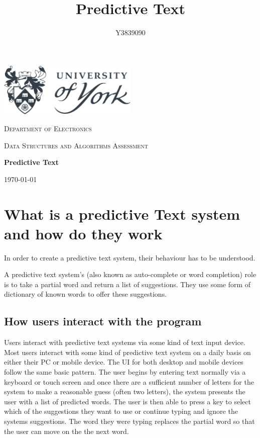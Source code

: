 \documentclass[10pt]{article} %
\title{
	Predictive Text
}
\author{Y3839090}
\begin{document}
    
	\begin{titlepage}
		\centering
		\includegraphics[width=0.5\textwidth]{UoY_logo}\par\vspace{1cm}
		{\scshape\LARGE Department of Electronics \par}
		\vspace{1cm}
		{\scshape\Large Data Structures and Algorithms Assessment \par}
		\vspace{2cm}
		{\huge\bfseries Predictive Text\par}

	
		\vfill
		{\Large\itshape \@author \par}
		\vspace{2cm}
		{\large \today\par}
	\end{titlepage}
	
	
	\tableofcontents
	\newpage
	
	
	\section{What is a predictive Text system and how do they work}
		In order to create a predictive text system, their behaviour has to be understood.
		
		A predictive text system's (also known as  auto-complete or word completion) role is to take a partial word and return a list of suggestions. They use some form of dictionary of known words to offer these suggestions.
		\subsection{How users interact with the program}
			Users interact with predictive text systems via some kind of text input device. Most users interact with some kind of predictive text system on a daily basis on either their PC or mobile device. The UI for both desktop and mobile devices follow the same basic pattern. The user begins by entering text normally via a keyboard or touch screen and once there are a sufficient number of letters for the system to make a reasonable guess (often two letters), the system presents the user with a list of predicted words. The user is then able to press a key to select which of the suggestions they want to use or continue typing and ignore the systems suggestions. The word they were typing replaces the partial word so that the user can move on the the next word.
\end{document}
